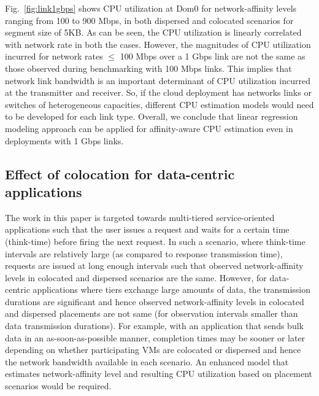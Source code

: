Fig.~\ref{fig:link1gbps} shows CPU utilization at Dom0
for network-affinity levels ranging from 100 to 900 Mbps, in 
both dispersed and colocated scenarios for segment size of
5KB. As can be seen, the CPU utilization is linearly correlated with
network rate in both the cases. 
However, the magnitudes of CPU utilization
incurred for network rates $\le$ 100 Mbps over a 1 Gbps link are not the 
same as those observed during benchmarking with 100 Mbps links. 
This implies that network link bandwidth is an important
determinant of CPU utilization incurred at the transmitter and
receiver. So, if the cloud deployment has networks links or switches 
of heterogeneous capacities,
different CPU estimation models would need to be
developed for each link type.
Overall, we conclude that 
linear regression modeling approach can be applied for affinity-aware
CPU estimation even in deployments with 1 Gbps links. 

\subsection{Effect of colocation for data-centric applications}
The work in this paper is targeted towards multi-tiered service-oriented
applications such that the user issues a request and waits 
for a certain time (think-time) before firing the next request.
In such a scenario, where think-time intervals are relatively large
(as compared to response transmission time),
requests are issued at long enough intervals
such that observed network-affinity levels
in colocated and dispersed scenarios are the same. 
However, for data-centric applications 
where tiers exchange large amounts of data, the transmission
durations are significant and hence 
observed network-affinity levels in colocated
and dispersed placements are not same (for observation intervals
smaller than data transmission durations).
For example, with an application
that sends bulk data in an as-soon-as-possible manner, 
completion times may be sooner or later depending
on whether participating VMs are colocated or dispersed
and hence the network bandwidth available in each scenario. 
An enhanced model that estimates network-affinity level 
and resulting CPU utilization based on placement scenarios would
be required.

